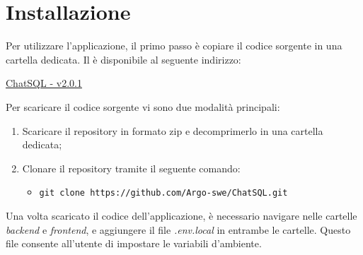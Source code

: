 \section{Installazione}

\par Per utilizzare l'applicazione, il primo passo è copiare il codice sorgente in una cartella dedicata. Il  è disponibile al seguente indirizzo:

\quad \href{https://github.com/Argo-swe/ChatSQL/tree/v2.0.1}{ChatSQL - v2.0.1} \newline

\par Per scaricare il codice sorgente vi sono due modalità principali:
\begin{enumerate}
  \item Scaricare il repository in formato zip e decomprimerlo in una cartella dedicata;
  \item Clonare il repository tramite il seguente comando:
  \begin{itemize} 
    \item \texttt{git clone https://github.com/Argo-swe/ChatSQL.git}
  \end{itemize}
\end{enumerate}

\vspace{0.5\baselineskip}
\par Una volta scaricato il codice dell'applicazione, è necessario navigare nelle cartelle \textit{backend} e \textit{frontend}, e aggiungere il file \textit{.env.local} in entrambe le cartelle. Questo file consente all'utente di impostare le variabili d'ambiente.